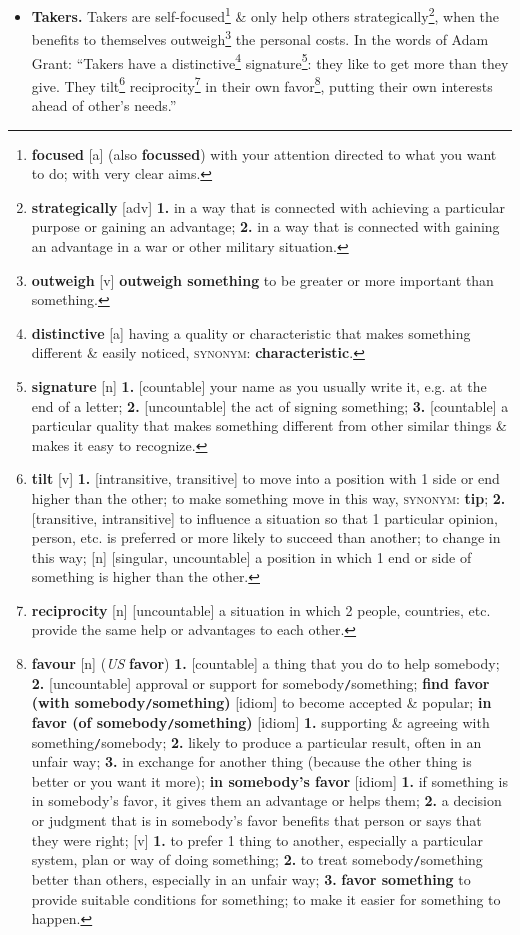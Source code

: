 \documentclass[oneside]{book}
\numberwithin{equation}{section}
\begin{document}
\begin{itemize}
	\item \textbf{Takers.} Takers are self-focused\footnote{\textbf{focused} [a] (also \textbf{focussed}) with your attention directed to what you want to do; with very clear aims.} \& only help others strategically\footnote{\textbf{strategically} [adv] \textbf{1.} in a way that is connected with achieving a particular purpose or gaining an advantage; \textbf{2.} in a way that is connected with gaining an advantage in a war or other military situation.}, when the benefits to themselves outweigh\footnote{\textbf{outweigh} [v] \textbf{outweigh something} to be greater or more important than something.} the personal costs. In the words of Adam Grant: ``Takers have a distinctive\footnote{\textbf{distinctive} [a] having a quality or characteristic that makes something different \& easily noticed, \textsc{synonym}: \textbf{characteristic}.} signature\footnote{\textbf{signature} [n] \textbf{1.} [countable] your name as you usually write it, e.g. at the end of a letter; \textbf{2.} [uncountable] the act of signing something; \textbf{3.} [countable] a particular quality that makes something different from other similar things \& makes it easy to recognize.}: they like to get more than they give. They tilt\footnote{\textbf{tilt} [v] \textbf{1.} [intransitive, transitive] to move into a position with 1 side or end higher than the other; to make something move in this way, \textsc{synonym}: \textbf{tip}; \textbf{2.} [transitive, intransitive] to influence a situation so that 1 particular opinion, person, etc. is preferred or more likely to succeed than another; to change in this way; [n] [singular, uncountable] a position in which 1 end or side of something is higher than the other.} reciprocity\footnote{\textbf{reciprocity} [n] [uncountable] a situation in which 2 people, countries, etc. provide the same help or advantages to each other.} in their own favor\footnote{\textbf{favour} [n] (\textit{US} \textbf{favor}) \textbf{1.} [countable] a thing that you do to help somebody; \textbf{2.} [uncountable] approval or support for somebody\texttt{/}something; \textbf{find favor (with somebody\texttt{/}something)} [idiom] to become accepted \& popular; \textbf{in favor (of somebody\texttt{/}something)} [idiom] \textbf{1.} supporting \& agreeing with something\texttt{/}somebody; \textbf{2.} likely to produce a particular result, often in an unfair way; \textbf{3.} in exchange for another thing (because the other thing is better or you want it more); \textbf{in somebody's favor} [idiom] \textbf{1.} if something is in somebody's favor, it gives them an advantage or helps them; \textbf{2.} a decision or judgment that is in somebody's favor benefits that person or says that they were right; [v] \textbf{1.} to prefer 1 thing to another, especially a particular system, plan or way of doing something; \textbf{2.} to treat somebody\texttt{/}something better than others, especially in an unfair way; \textbf{3.} \textbf{favor something} to provide suitable conditions for something; to make it easier for something to happen.}, putting their own interests ahead of other's needs.''

\end{itemize}
\end{document}
